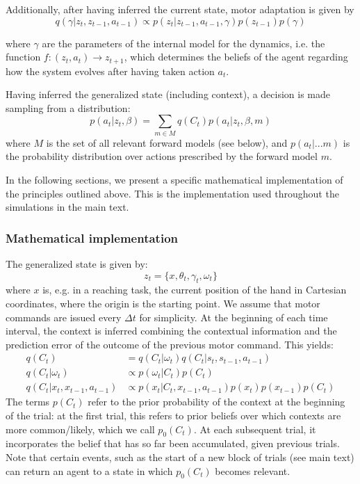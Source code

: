 \documentclass[a4paper,doc,floatsintext,natbib]{apa6}
\begin{document}
Additionally, after having inferred the current state, motor adaptation is given by
\[
q(\gamma | z_t, z_{t-1}, a_{t-1}) \propto p(z_t | z_{t-1}, a_{t-1}, \gamma)p(z_{t-1})p(\gamma)
\]

where $\gamma$ are the parameters of the internal model for the dynamics,
i.e. the function $f: (z_t, a_t) \rightarrow z_{t+1}$, which determines the beliefs of
the agent regarding how the system evolves after having taken action $a_t$.

Having inferred the generalized state (including context), a decision is made
sampling from a distribution:
\begin{equation}
p(a_t | z_t, \beta) = \displaystyle\sum_{m \in M}q(C_t)p(a_t | z_t, \beta, m)
\end{equation}
where $M$ is the set of all relevant forward models (see below), and
$p(a_t | ... m)$ is the probability distribution over actions prescribed by the
forward model $m$.

In the following sections, we present a specific mathematical implementation
of the principles outlined above. This is the implementation used throughout the
simulations in the main text.

\subsubsection{Mathematical implementation}
The generalized state is given by:
\begin{equation}
z_t = \{x, \theta_t, \gamma_t, \omega_t\}
\end{equation}
where $x$ is, e.g. in a reaching task, the current position of the hand in
Cartesian coordinates, where the origin is the starting point. We assume that
motor commands are issued every $\Delta t$ for simplicity. At the beginning of
each time interval, the context is inferred combining the contextual
information and the prediction error of the outcome of the previous motor
command. This yields:
\begin{align}
  q(C_t) &= q(C_t | \omega_t)q(C_t | s_t, s_{t-1}, a_{t-1}) \\ \label{eqn:estimated-context}
  q(C_t | \omega_t) &\propto p(\omega_t | C_t)p(C_t) \\
  q(C_t | x_t, x_{t-1}, a_{t-1}) &\propto p(x_t | C_t, x_{t-1}, a_{t-1})p(x_t)p(x_{t-1})p(C_t)
\end{align}
The terms $p(C_t)$ refer to the prior probability of the context at the
beginning of the trial: at the first trial, this refers to prior beliefs over
which contexts are more common/likely, which we call $p_0(C_t)$. At each
subsequent trial, it incorporates the belief that has so far been accumulated,
given previous trials. Note that certain events, such as the start of a new
block of trials (see main text) can return an agent to a state in which
$p_0(C_t)$ becomes relevant.
\end{document}
